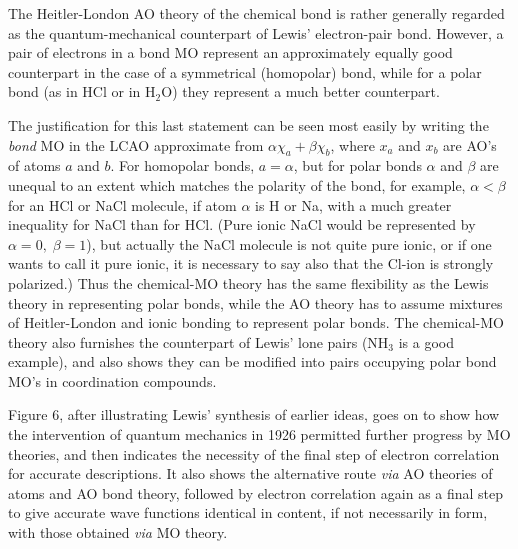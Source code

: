 \documentclass[11pt]{memoir}
\begin{document}
The Heitler-London AO theory of the chemical bond is rather generally regarded as the quantum-mechanical counterpart of Lewis' electron-pair bond.  However, a pair of electrons in a bond MO represent an approximately equally good counterpart in the case of a symmetrical (homopolar) bond, while for a polar bond (as in HCl or in $\mathrm{H_2O}$) they represent a much better counterpart.

The justification for this last statement can be seen most easily by writing the \emph{bond} MO in the LCAO approximate from $\alpha \chi _a + \beta \chi _b $, where $x_a$ and $x_b$ are AO's of atoms $a$ and $b$.  For homopolar bonds, $a = \alpha$, but for polar bonds $\alpha$ and $\beta$ are unequal to an extent which matches the polarity of the bond, for example, $\alpha < \beta$ for an HCl or NaCl molecule, if atom $\alpha$ is H or Na, with a much greater inequality for NaCl than for HCl.  (Pure ionic NaCl would be represented by $\alpha = 0, \; \beta = 1$), but actually the NaCl molecule is not quite pure ionic, or if one wants to call it pure ionic, it is necessary to say also that the Cl-ion is strongly polarized.)  Thus the chemical-MO theory has the same flexibility as the Lewis theory in representing polar bonds, while the AO theory has to assume mixtures of Heitler-London and ionic bonding to represent polar bonds.  The chemical-MO theory also furnishes the counterpart of Lewis' lone pairs ($\mathrm{NH_3}$ is a good example), and also shows they can be modified into pairs occupying polar bond MO's in coordination compounds.  

Figure 6, after illustrating Lewis' synthesis of earlier ideas, goes on to show how the intervention of quantum mechanics in 1926 permitted further progress by MO theories, and then indicates the necessity of the final step of electron correlation for accurate descriptions.  It also shows the alternative route \emph{via} AO theories of atoms and AO bond theory, followed by electron correlation again as a final step to give accurate wave functions identical in content, if not necessarily in form, with those obtained \emph{via} MO theory.
\end{document}

